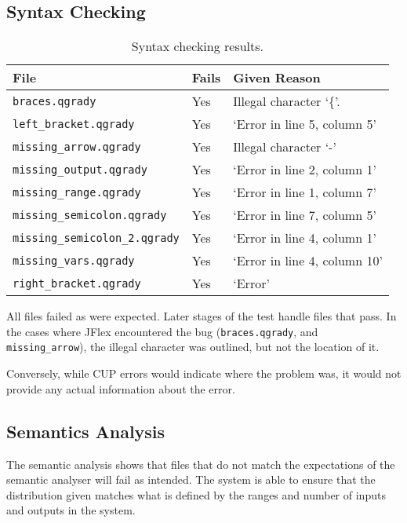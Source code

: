 \documentclass[report.tex]{subfiles}
\begin{document}
\subsection{Syntax Checking} %
\label{sub:syntax_checking_res}
\begin{table}[H]
    \centering
    \begin{tabular}{l | l | l}
    File & Fails & Given Reason \\
    \hline
    \texttt{braces.qgrady} & Yes & Illegal character `\{'. \\
    \texttt{left\_bracket.qgrady} & Yes & `Error in line 5, column 5' \\
    \texttt{missing\_arrow.qgrady} & Yes & Illegal character `-' \\
    \texttt{missing\_output.qgrady} & Yes & `Error in line 2, column 1' \\
    \texttt{missing\_range.qgrady} & Yes & `Error in line 1, column 7' \\
    \texttt{missing\_semicolon.qgrady} & Yes & `Error in line 7, column 5' \\
    \texttt{missing\_semicolon\_2.qgrady} & Yes & `Error in line 4, column 1' \\
    \texttt{missing\_vars.qgrady} & Yes & `Error in line 4, column 10' \\
    \texttt{right\_bracket.qgrady} & Yes & `Error' \\
    \hline
    \end{tabular}
    \caption{Syntax checking results.}
    \label{tab:syntax_result}
\end{table}

All files failed as were expected. Later stages of the test handle files that
pass. In the cases where JFlex encountered the bug (\texttt{braces.qgrady}, and
\texttt{missing\_arrow}),
the illegal character was outlined, but not the location of it.

Conversely, while CUP errors would indicate where the problem was, it would not
provide any actual information about the error.

\subsection{Semantics Analysis} %
\label{sub:semantics_analysis}
The semantic analysis shows that files that do not match the expectations of the
semantic analyser will fail as intended. The system is able to ensure that
the distribution given matches what is defined by the ranges and number of
inputs and outputs in the system.
\end{document}
